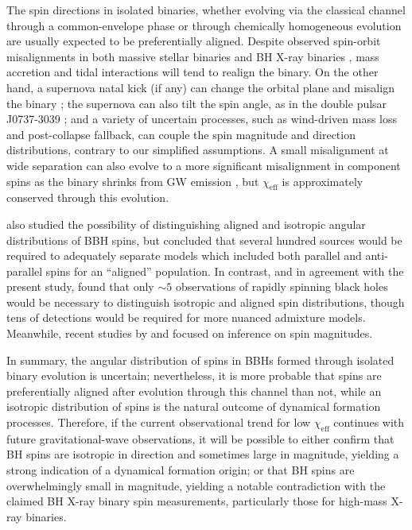 \documentclass[modern,linenumbers]{aastex61}
\newcommand{\chieff}{\chi_\mathrm{eff}}
\begin{document}
The spin directions in isolated binaries, whether evolving via the
classical channel through a common-envelope phase
\citep{TutukovYungelson:1973,TutukovYungelson:1993,Lipunov:1997,2016Natur.534..512B,Stevenson:2017}
or through chemically homogeneous evolution
\citep{MandeldeMink:2016,Marchant:2016} are usually expected to be
preferentially aligned.  Despite observed spin-orbit misalignments in
both massive stellar binaries
\citep{Albrecht:2009,2014ApJ...785...83A} and BH X-ray binaries
\citep{Orosz:2001,Martin:2008b,Martin:2008,MorningstarMiller:2014},
mass accretion and tidal interactions will tend to realign the binary.
On the other hand, a supernova natal kick (if any) can change the
orbital plane and misalign the binary
\citep{2000ApJ...541..319K,2013PhRvD..87j4028G}; the supernova can
also tilt the spin angle, as in the double pulsar J0737-3039
\citep{2011ApJ...742...81F}; and a variety of uncertain processes,
such as wind-driven mass loss and post-collapse fallback, can couple
the spin magnitude and direction distributions, contrary to our
simplified assumptions.  A small misalignment at wide separation can
also evolve to a more significant misalignment in component spins as
the binary shrinks from \ac{GW} emission \citep{2015PhRvD..92f4016G},
but $\chieff$ is approximately conserved through this evolution.

\citet{2017CQGra..34cLT01V} also studied the possibility of
distinguishing aligned and isotropic angular distributions of \ac{BBH}
spins, but concluded that several hundred sources would be required to
adequately separate models which included both parallel and
anti-parallel spins for an ``aligned'' population.  In contrast, and
in agreement with the present study, \citet{Stevenson:2017spin} found
that only $\sim 5$ observations of rapidly spinning black holes would
be necessary to distinguish isotropic and aligned spin distributions,
though tens of detections would be required for more nuanced admixture
models.  Meanwhile, recent studies by
\citet{2017arXiv170306869F} and \citet{2017arXiv170306223G} focused on inference
on spin magnitudes.

In summary, the angular distribution of spins in \acp{BBH} formed
through isolated binary evolution is uncertain; nevertheless, it is
more probable that spins are preferentially aligned after evolution
through this channel than not, while an isotropic distribution of
spins is the natural outcome of dynamical formation processes.
Therefore, if the current observational trend for low $\chieff$
continues with future gravitational-wave observations, it will be
possible to either confirm that \ac{BH} spins are isotropic in
direction and sometimes large in magnitude, yielding a strong
indication of a dynamical formation origin; or that \ac{BH} spins are
overwhelmingly small in magnitude, yielding a notable contradiction
with the claimed \ac{BH} X-ray binary spin measurements, particularly
those for high-mass X-ray binaries.
\end{document}
